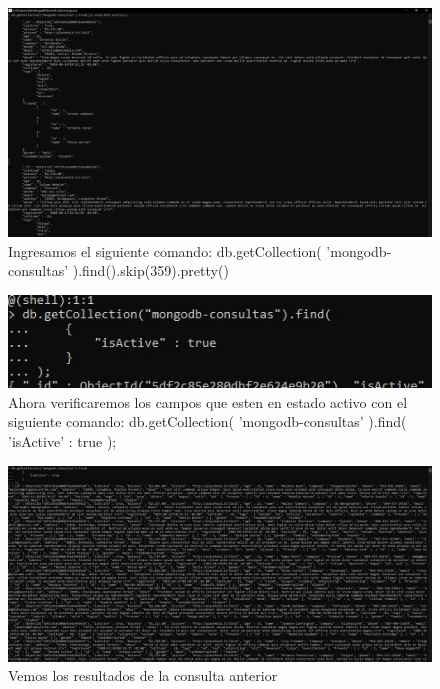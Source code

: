 \documentclass[preprint,12pt]{elsarticle}
\begin{document}
\begin{figure}[H]
	\begin{center}
		\includegraphics[width=12cm]{./IMAGENES/foto10} 
		\caption{Ingresamos el siguiente comando: db.getCollection( 'mongodb-consultas' ).find().skip(359).pretty()}
	\end{center}
\end{figure}

\begin{figure}[H]
	\begin{center}
		\includegraphics[width=12cm]{./IMAGENES/foto11} 
		\caption{Ahora verificaremos los campos que esten en estado activo con el siguiente comando: db.getCollection( 'mongodb-consultas' ).find( 'isActive' : true ); }
	\end{center}
\end{figure}

\begin{figure}[H]
	\begin{center}
		\includegraphics[width=12cm]{./IMAGENES/foto12} 
		\caption{Vemos los resultados de la consulta anterior}
	\end{center}
\end{figure}
\end{document}
